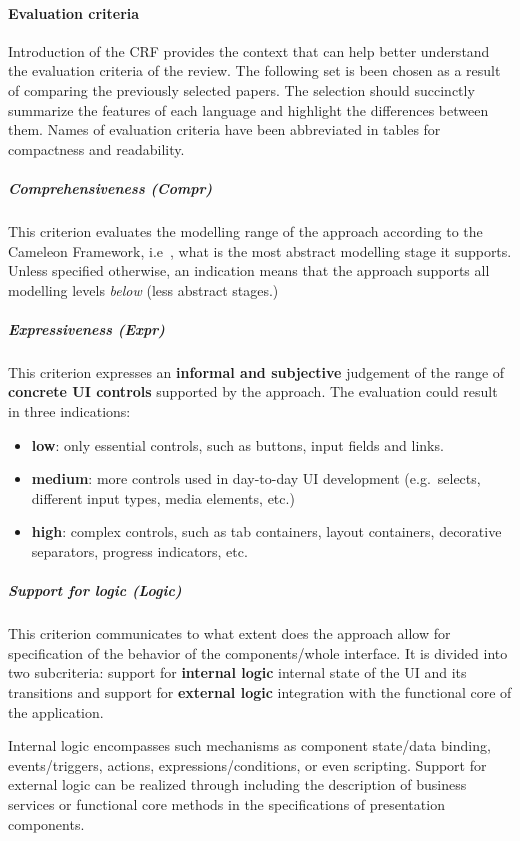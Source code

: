 \paragraph{Evaluation criteria}

Introduction of the CRF provides the context that can help better understand the evaluation criteria of the review.
The following set is been chosen as a result of comparing the previously selected papers.
The selection should succinctly summarize the features of each language and highlight the differences between them.
Names of evaluation criteria have been abbreviated in tables for compactness and readability.

\subparagraph{Comprehensiveness (Compr)}
This criterion evaluates the modelling range of the approach according to the Cameleon Framework, i.e\ , what is the most abstract modelling stage it supports.
Unless specified otherwise, an indication means that the approach supports all modelling levels \emph{below} (less abstract stages.)

\subparagraph{Expressiveness (Expr)}
This criterion expresses an \textbf{informal and subjective} judgement of the range of \textbf{concrete UI controls} supported by the approach.
The evaluation could result in three indications:
\begin{itemize}
    \item \textbf{low}: only essential controls, such as buttons, input fields and links.
    \item \textbf{medium}: more controls used in day-to-day UI development (e.g.\ selects, different input types, media elements, etc.)
    \item \textbf{high}: complex controls, such as tab containers, layout containers, decorative separators, progress indicators, etc.
\end{itemize}

\subparagraph{Support for logic (Logic)}
This criterion communicates to what extent does the approach allow for specification of the behavior of the components/whole interface.
It is divided into two subcriteria: support for \textbf{internal logic}\,\textemdash\,internal state of the UI and its transitions and support for \textbf{external logic}\,\textemdash\,integration with the functional core of the application.

Internal logic encompasses such mechanisms as component state/data binding, events/triggers, actions, expressions/conditions, or even scripting.
Support for external logic can be realized through including the description of business services or functional core methods in the specifications of presentation components.


